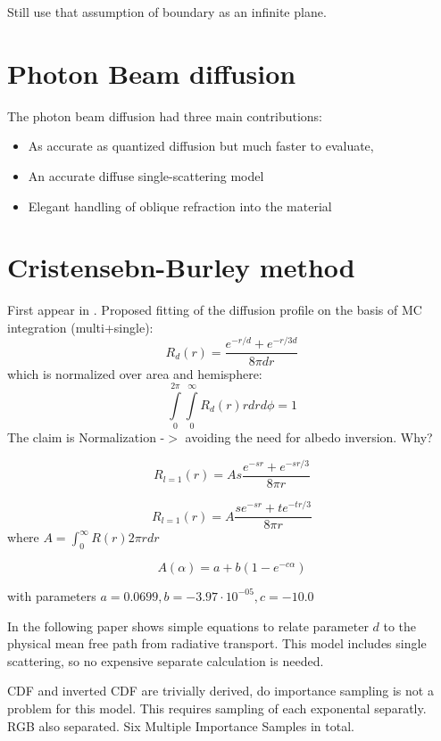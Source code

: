 Still use that assumption of boundary as an infinite plane.

\section{Photon Beam diffusion}
The photon beam diffusion \cite{Habel:2013:PBD:2600890.2600896} had three main
contributions:
\begin{itemize}
    \item As accurate as quantized diffusion but much faster to evaluate,
    \item An accurate diffuse single-scattering model
    \item Elegant handling of oblique refraction into the material
\end{itemize}

\section{Cristensebn-Burley method}

First appear in \cite{Burley:disney_siggraph15}. Proposed fitting of the
diffusion profile on the basis of MC integration (multi+single):
\[
R_d(r) = \dfrac{e^{-r/d}+e^{-r/3d}}{8\pi dr}
\]
which is normalized over area and hemisphere:
\[
\int\limits_0^{2\pi}\int\limits_0^\infty R_d(r)rdrd\phi = 1
\]
The claim is Normalization -$>$ avoiding the need for albedo inversion. Why?

\[
R_{l=1}(r) = As\dfrac{e^{-sr}+e^{-sr/3}}{8\pi r}
\]

\[
R_{l=1}(r) = A\dfrac{se^{-sr}+te^{-tr/3}}{8\pi r}
\]
where $A=\int_0^{\infty} R(r)2\pi rdr$

\[
A(\alpha) = a + b(1- e^{-c\alpha})
\]

with parameters $a = 0.0699, b = -3.97\cdot 10^{-05}, c =
-10.0$

In the following paper \cite{Christensen:2015:ARP:2775280.2792555} shows simple
equations to relate parameter $d$ to the physical mean free path from radiative
transport. This model includes single scattering, so no expensive separate
calculation is needed.

CDF and inverted CDF are trivially derived, do importance sampling is not a
problem for this model. This requires sampling of each exponental separatly. RGB
also separated. Six Multiple Importance Samples in total.

